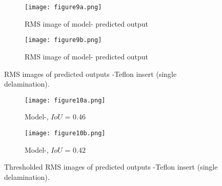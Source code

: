 \begin{figure} [!h]
	\begin{subfigure}[b]{.48\textwidth}
		\centering
		\texttt{[image: figure9a.png]}
		\caption{RMS image of model- predicted output}
		\label{fig:RMS_CFRP_Teflon_3o_saeed}
	\end{subfigure}
	\hfill
	\begin{subfigure}[b]{.48\textwidth}
		\centering
		\texttt{[image: figure9b.png]}
		\caption{RMS image of model- predicted output} 
		\label{fig:RMS_CFRP_Teflon_3o_ijjeh}
	\end{subfigure}
	\caption{RMS images of predicted outputs -Teflon insert (single delamination).}
	\label{fig:RMS_CFRP_Teflon_3o_images}
\end{figure} 
\begin{figure} [!h]
	\begin{subfigure}[b]{.48\textwidth}
		\centering
		\texttt{[image: figure10a.png]}
		\caption{Model-, \(IoU\) = \(0.46\)}
		\label{fig:RMS_threshold_CFRP_Teflon_3o_saeed}
	\end{subfigure}
	\hfill
	\begin{subfigure}[b]{.48\textwidth}
		\centering
		\texttt{[image: figure10b.png]}
		\caption{Model-, \(IoU\) = \(0.42\)} 
		\label{fig:RMS_threshold_CFRP_Teflon_3o_ijjeh}
	\end{subfigure}
	\caption{Thresholded RMS images of predicted outputs -Teflon insert (single delamination).}
	\label{fig:RMS_threshold_CFRP_Teflon_3o_images}
\end{figure} 
\clearpage
